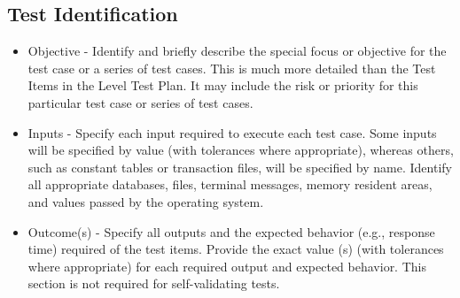 \begin{enumerate}
\section{Test Identification}
\begin{itemize}
	\item  Objective - Identify and briefly describe the special focus or objective for the test case or a series of test cases.
This is much more detailed than the Test Items in the Level Test Plan. It may include the risk or priority for this particular test case or series of test cases.
	\item  Inputs - Specify each input required to execute each test case. Some inputs will be specified by value (with
tolerances where appropriate), whereas others, such as constant tables or transaction files, will be
specified by name. Identify all appropriate databases, files, terminal messages, memory resident areas,
and values passed by the operating system.
	\item  Outcome(s) - Specify all outputs and the expected behavior (e.g., response time) required of the test items. Provide
the exact value (s) (with tolerances where appropriate) for each required output and expected behavior.
This section is not required for self-validating tests.
\end{itemize}


\end{enumerate}
